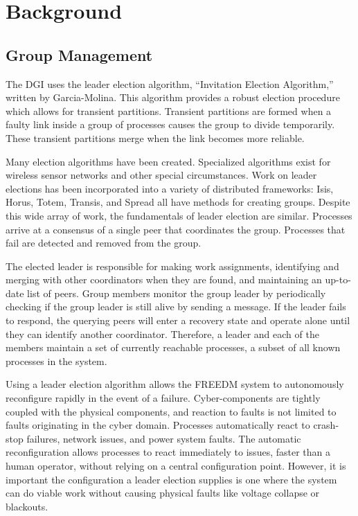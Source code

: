 \section{Background}

\subsection{Group Management}

The DGI uses the leader election algorithm, ``Invitation Election Algorithm,'' written by Garcia-Molina\cite{INVITATIONELECTION}.
This algorithm provides a robust election procedure which allows for transient partitions.
Transient partitions are formed when a faulty link inside a group of processes causes the group to divide temporarily.
These transient partitions merge when the link becomes more reliable.

Many election algorithms have been created.
Specialized algorithms exist for wireless sensor networks\cite{LE-WSN-1}\cite{LE-WSN-2} and other special circumstances\cite{LE-SPECIALCIRCUMSTANCES-1}\cite{LE-SPECIALCIRCUMSTANCES-2}.
Work on leader elections has been incorporated into a variety of distributed frameworks: Isis\cite{ISISTOOLKIT}, Horus\cite{HORUSTOOLKIT}, Totem\cite{TOTEMTOOLKIT}, Transis\cite{TRANSISTOOLKIT}, and Spread\cite{SPREADTOOLKIT} all have methods for creating groups.
Despite this wide array of work, the fundamentals of leader election are similar.
Processes arrive at a consensus of a single peer that coordinates the group.
Processes that fail are detected and removed from the group.

The elected leader is responsible for making work assignments, identifying and merging with other coordinators when they are found, and maintaining an up-to-date list of peers.
Group members monitor the group leader by periodically checking if the group leader is still alive by sending a message.
If the leader fails to respond, the querying peers will enter a recovery state and operate alone until they can identify another coordinator.
Therefore, a leader and each of the members maintain a set of currently reachable processes, a subset of all known processes in the system.

Using a leader election algorithm allows the FREEDM system to autonomously reconfigure rapidly in the event of a failure.
Cyber-components are tightly coupled with the physical components, and reaction to faults is not limited to faults originating in the cyber domain.
Processes automatically react to crash-stop failures, network issues, and power system faults.
The automatic reconfiguration allows processes to react immediately to issues, faster than a human operator, without relying on a central configuration point.
However, it is important the configuration a leader election supplies is one where the system can do viable work without causing physical faults like voltage collapse or blackouts\cite{HARINI}.

